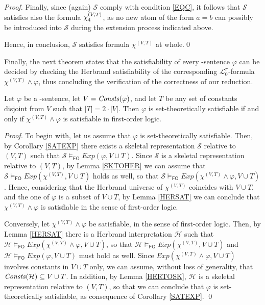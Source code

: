 \documentclass[a4paper]{llncs}
\newcommand{\Elpizero}{\ensuremath{\mathcal{L}_{0}^{\pi}}\xspace}
\newcommand{\HExp}{Exp}
\newcommand{\atset}{\mathcal{S}}
\newcommand{\consta}{a}
\newcommand{\constb}{b}
\newcommand{\hinter}{\ensuremath{\mathcal{H}}}
\newcommand{\fomodels}[2]{#1 \models_{\mathsf{FO}} #2}
\begin{document}
\begin{proof}

Finally, since (again) $\atset$ comply with condition \ref{EQC},
it follows that $\atset$ satisfies also the formula $\chi_4^{(V,T)}$,
as no new atom of the form $\consta = \constb$ can
possibly be introduced into $\atset$ during the extension process
indicated above.

Hence, in conclusion, $\atset$ satisfies formula
$\chi^{(V,T)}$ at whole.\qed
\end{proof}
%
Finally, the next theorem states that the satisfiability of every
\Forallpizero-sentence $\varphi$ can be decided by checking the
Herbrand satisfiability of the corresponding \Elpizero-formula
$\chi^{(V,T)} \wedge \varphi$, thus concluding the verification of the
correctness of our reduction.

\begin{theorem}\label{FORALLPIZEROSAT}
Let $\varphi$ be a \Forallpizero-sentence, let $V=\mathit{Consts}(\varphi)$,
and let $T$ be any set of constants disjoint from $V$ such that $|T|=2\cdot|V|$.  Then $\varphi$ is set-theoretically 
satisfiable if and only if $\chi^{(V,T)} \wedge \varphi$ is 
satisfiable in first-order logic.
\end{theorem}
\begin{proof}
To begin with, let us assume that $\varphi$ is set-theoretically satisfiable.  Then, by
Corollary \ref{SATEXP}  there exists a skeletal representation $\atset$ relative to $(V,T)$ such that 
$\fomodels{\atset}{\HExp(\varphi, V \cup T)}$. Since $\atset$ is a skeletal representation relative to $(V,T)$, by Lemma \ref{SKTOHER} we can assume that
$\fomodels{\atset}{\HExp(\chi^{(V,T)}, V \cup T)}$ holds as well, so that
$\fomodels{\atset}{\HExp(\chi^{(V,T)} \wedge \varphi, V \cup T)}$. Hence, considering that the Herbrand universe of $\chi^{(V,T)}$ coincides with $V \cup T$, and
the one of $\varphi$ is a subset of $V \cup T$, by Lemma \ref{HERSAT} we can conclude
that $\chi^{(V,T)} \wedge \varphi$ is satisfiable in the sense of first-order
logic.

Conversely, let $\chi^{(V,T)} \wedge \varphi$ be satisfiable,
in the sense of first-order logic. Then, by  Lemma \ref{HERSAT} there is a Herbrand
interpretation $\hinter$ such that 
$\fomodels{\hinter}{\HExp(\chi^{(V,T)}\wedge\varphi, V \cup T)}$, so that 
$\fomodels{\hinter}{\HExp(\chi^{(V,T)}, V \cup T)}$
and $\fomodels{\hinter}{\HExp(\varphi, V \cup T)}$ must hold as well.
Since $\HExp(\chi^{(V,T)}\wedge\varphi, V \cup T)$ involves  
constants in $V \cup T$ only, we can 
assume, without loss of generality, that 
$\Consts(\hinter)\subseteq V \cup T$.
In addition, by Lemma \ref{HERTOSK}, 
$\hinter$ is a skeletal representation relative to 
$(V,T)$, so that we can conclude that $\varphi$ is set-theoretically 
satisfiable, as consequence
of Corollary \ref{SATEXP}. \qed
\end{proof}
\end{document}

